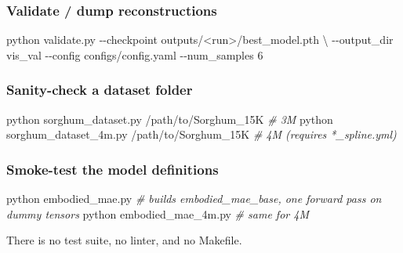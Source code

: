 \documentclass[
  10pt,
]{article}
\newenvironment{Shaded}{}{}
\newcommand{\AttributeTok}[1]{\textcolor[rgb]{0.49,0.56,0.16}{#1}}
\newcommand{\CommentTok}[1]{\textcolor[rgb]{0.38,0.63,0.69}{\textit{#1}}}
\newcommand{\DataTypeTok}[1]{\textcolor[rgb]{0.56,0.13,0.00}{#1}}
\newcommand{\ExtensionTok}[1]{#1}
\newcommand{\NormalTok}[1]{#1}
\newcommand{\OperatorTok}[1]{\textcolor[rgb]{0.40,0.40,0.40}{#1}}
\begin{document}
\subsubsection{Validate / dump
reconstructions}\label{validate-dump-reconstructions}

\begin{Shaded}
\begin{Highlighting}[]
\ExtensionTok{python}\NormalTok{ validate.py }\AttributeTok{{-}{-}checkpoint}\NormalTok{ outputs/}\OperatorTok{\textless{}}\NormalTok{run}\OperatorTok{\textgreater{}}\NormalTok{/best\_model.pth }\DataTypeTok{\textbackslash{}}
                   \AttributeTok{{-}{-}output\_dir}\NormalTok{ vis\_val }\AttributeTok{{-}{-}config}\NormalTok{ configs/config.yaml }\AttributeTok{{-}{-}num\_samples}\NormalTok{ 6}
\end{Highlighting}
\end{Shaded}

\subsubsection{Sanity-check a dataset
folder}\label{sanity-check-a-dataset-folder}

\begin{Shaded}
\begin{Highlighting}[]
\ExtensionTok{python}\NormalTok{ sorghum\_dataset.py    /path/to/Sorghum\_15K    }\CommentTok{\# 3M}
\ExtensionTok{python}\NormalTok{ sorghum\_dataset\_4m.py /path/to/Sorghum\_15K    }\CommentTok{\# 4M (requires *\_spline.yml)}
\end{Highlighting}
\end{Shaded}

\subsubsection{Smoke-test the model
definitions}\label{smoke-test-the-model-definitions}

\begin{Shaded}
\begin{Highlighting}[]
\ExtensionTok{python}\NormalTok{ embodied\_mae.py       }\CommentTok{\# builds embodied\_mae\_base, one forward pass on dummy tensors}
\ExtensionTok{python}\NormalTok{ embodied\_mae\_4m.py    }\CommentTok{\# same for 4M}
\end{Highlighting}
\end{Shaded}

There is no test suite, no linter, and no Makefile.
\end{document}
